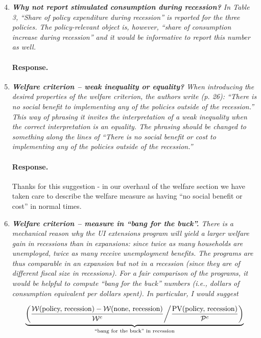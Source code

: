 \documentclass[12pt,letterpaper,english]{article}
\begin{document}
\begin{enumerate}
\setcounter{enumi}{3}
	\item \textit{\textbf{Why not report stimulated consumption during recession?} In Table 3, ``Share of policy expenditure during recession'' is reported for the three policies. The policy-relevant object is, however, ``share of consumption increase during recession'' and it would be informative to report this number as well.} 
	 
	\paragraph{Response.} 

	\item \textit{\textbf{Welfare criterion – weak inequality or equality?} When introducing the desired properties of the welfare criterion, the authors write (p. 26): ``There is no social benefit to implementing any of the policies outside of the recession.'' This way of phrasing it invites the interpretation of a weak inequality when the correct interpretation	is an equality. The phrasing should be changed to something along the	lines of ``There is no social benefit or cost to implementing any of the policies outside of the recession.''}

	\paragraph{Response.} Thanks for this suggestion - in our overhaul of the welfare section we have taken care to describe the welfare measure as having ``no social benefit or cost'' in normal times.

	\item \textit{\textbf{Welfare criterion – measure in ``bang for the buck''.} There is a mechanical reason why the UI extensions program will yield a larger welfare gain in recessions than in expansions: since twice as many households are unemployed, twice as many receive unemployment benefits. The programs are thus comparable in an expansion	but not in a recession (since they are of different fiscal size in recessions).	For a fair comparison of the programs, it would be helpful to compute ``bang for the buck'' numbers (i.e., dollars of consumption equivalent per dollars spent). In particular, I would suggest} 
	
	\[ \underbrace{\left( \frac{\mathcal{W}(\text{policy, recession}) - \mathcal{W}(\text{none, recession})}{\mathcal{W}^c} \middle/ \frac{\text{PV}(\text{policy, recession})}{\mathcal{P}^c} \right)}_{\text{``bang for the buck'' in recession}} \]
	

\end{enumerate}
\end{document}
